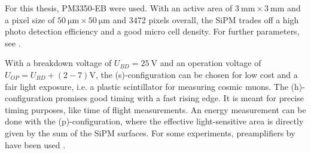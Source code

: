 For this thesis,  PM3350-EB were used. With an active area of $\SI{3}{\milli\meter}\times\SI{3}{\milli\meter}$ and a pixel size of $\SI{50}{\micro\meter}\times\SI{50}{\micro\meter}$ and 3472 pixels overall, the SiPM trades off a high photo detection efficiency and a good micro cell density. For further parameters, see \cite{SiPM_Manual}. \par
With a breakdown voltage of $U_{BD}=\SI{25}{\volt}$ and an operation voltage of $U_{OP}=U_{BD}+(2-7)\si{\volt}$, the (s)-configuration can be chosen for low cost and a fair light exposure, i.e. a plastic scintillator for measuring cosmic muons. The (h)-configuration promises good timing with a fast rising edge. It is meant for precise timing purposes, like time of flight measurements. An energy measurement can be done with the (p)-configuration, where the effective light-sensitive area is directly given by the sum of the SiPM surfaces. For some experiments, preamplifiers by  have been used \cite{photonique}.\par 

